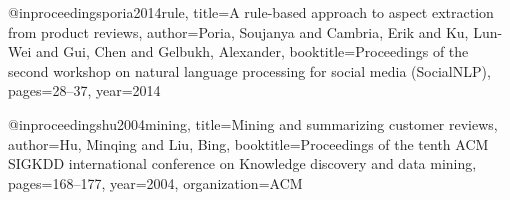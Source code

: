 @inproceedings{poria2014rule,
  title={A rule-based approach to aspect extraction from product reviews},
  author={Poria, Soujanya and Cambria, Erik and Ku, Lun-Wei and Gui, Chen and Gelbukh, Alexander},
  booktitle={Proceedings of the second workshop on natural language processing for social media (SocialNLP)},
  pages={28--37},
  year={2014}
}

@inproceedings{hu2004mining,
  title={Mining and summarizing customer reviews},
  author={Hu, Minqing and Liu, Bing},
  booktitle={Proceedings of the tenth ACM SIGKDD international conference on Knowledge discovery and data mining},
  pages={168--177},
  year={2004},
  organization={ACM}
}
